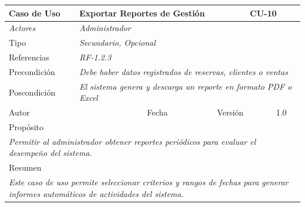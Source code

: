 \begin{table}[H]
\begin{tabular}{|llllllll|}
\hline
\multicolumn{1}{|l|}{\cellcolor[HTML]{F2F2F2}Caso de Uso} & \multicolumn{5}{l|}{Exportar Reportes de Gestión} & \multicolumn{2}{l|}{\cellcolor[HTML]{E6E6E6}CU-10} \\ \hline
\multicolumn{1}{|l|}{{\color[HTML]{808080} \textit{Actores}}} & \multicolumn{7}{l|}{{\color[HTML]{808080} \textit{Administrador}}} \\ \hline
\multicolumn{1}{|l|}{Tipo} & \multicolumn{7}{l|}{{\color[HTML]{808080} \textit{Secundario, Opcional}}} \\ \hline
\multicolumn{1}{|l|}{Referencias} & \multicolumn{2}{l|}{{\color[HTML]{808080} \textit{RF-1.2.3}}} & \multicolumn{5}{l|}{} \\ \hline
\multicolumn{1}{|l|}{Precondición} & \multicolumn{7}{l|}{{\color[HTML]{808080} \textit{Debe haber datos registrados de reservas, clientes o ventas}}} \\ \hline
\multicolumn{1}{|l|}{Poscondición} & \multicolumn{7}{l|}{{\color[HTML]{808080} \textit{El sistema genera y descarga un reporte en formato PDF o Excel}}} \\ \hline
\multicolumn{1}{|l|}{Autor} & \multicolumn{1}{l|}{} & \multicolumn{2}{l|}{Fecha} & \multicolumn{1}{l|}{} & \multicolumn{2}{l|}{Versión} & 1.0 \\ \hline
\multicolumn{8}{|l|}{Propósito} \\ \hline
\multicolumn{8}{|p{15cm}|}{{\color[HTML]{808080} \textit{Permitir al administrador obtener reportes periódicos para evaluar el desempeño del sistema.}}} \\ \hline
\multicolumn{8}{|l|}{Resumen} \\ \hline
\multicolumn{8}{|p{15cm}|}{{\color[HTML]{808080} \textit{Este caso de uso permite seleccionar criterios y rangos de fechas para generar informes automáticos de actividades del sistema.}}} \\ \hline
\end{tabular}
\end{table}


